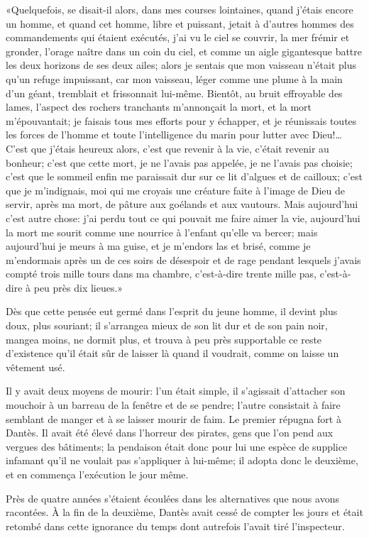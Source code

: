 «Quelquefois, se disait-il alors, dans mes courses lointaines, quand j'étais encore un homme, et quand cet homme, libre et puissant, jetait à d'autres hommes des commandements qui étaient exécutés, j'ai vu le ciel se couvrir, la mer frémir et gronder, l'orage naître dans un coin du ciel, et comme un aigle gigantesque battre les deux horizons de ses deux ailes; alors je sentais que mon vaisseau n'était plus qu'un refuge impuissant, car mon vaisseau, léger comme une plume à la main d'un géant, tremblait et frissonnait lui-même. Bientôt, au bruit effroyable des lames, l'aspect des rochers tranchants m'annonçait la mort, et la mort m'épouvantait; je faisais tous mes efforts pour y échapper, et je réunissais toutes les forces de l'homme et toute l'intelligence du marin pour lutter avec Dieu!\dots C'est que j'étais heureux alors, c'est que revenir à la vie, c'était revenir au bonheur; c'est que cette mort, je ne l'avais pas appelée, je ne l'avais pas choisie; c'est que le sommeil enfin me paraissait dur sur ce lit d'algues et de cailloux; c'est que je m'indignais, moi qui me croyais une créature faite à l'image de Dieu de servir, après ma mort, de pâture aux goélands et aux vautours. Mais aujourd'hui c'est autre chose: j'ai perdu tout ce qui pouvait me faire aimer la vie, aujourd'hui la mort me sourit comme une nourrice à l'enfant qu'elle va bercer; mais aujourd'hui je meurs à ma guise, et je m'endors las et brisé, comme je m'endormais après un de ces soirs de désespoir et de rage pendant lesquels j'avais compté trois mille tours dans ma chambre, c'est-à-dire trente mille pas, c'est-à-dire à peu près dix lieues.»

Dès que cette pensée eut germé dans l'esprit du jeune homme, il devint plus doux, plus souriant; il s'arrangea mieux de son lit dur et de son pain noir, mangea moins, ne dormit plus, et trouva à peu près supportable ce reste d'existence qu'il était sûr de laisser là quand il voudrait, comme on laisse un vêtement usé.

Il y avait deux moyens de mourir: l'un était simple, il s'agissait d'attacher son mouchoir à un barreau de la fenêtre et de se pendre; l'autre consistait à faire semblant de manger et à se laisser mourir de faim. Le premier répugna fort à Dantès. Il avait été élevé dans l'horreur des pirates, gens que l'on pend aux vergues des bâtiments; la pendaison était donc pour lui une espèce de supplice infamant qu'il ne voulait pas s'appliquer à lui-même; il adopta donc le deuxième, et en commença l'exécution le jour même.

Près de quatre années s'étaient écoulées dans les alternatives que nous avons racontées. À la fin de la deuxième, Dantès avait cessé de compter les jours et était retombé dans cette ignorance du temps dont autrefois l'avait tiré l'inspecteur.

